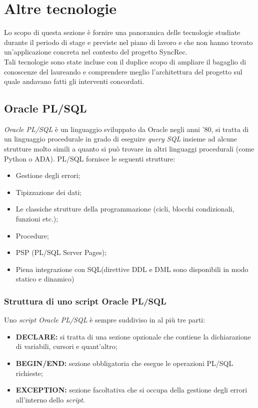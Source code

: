 

\chapter{Altre tecnologie} \label{Appendice-1}

Lo scopo di questa sezione è fornire una panoramica delle tecnologie studiate durante il periodo di stage e previste nel piano di lavoro e che non hanno trovato un'applicazione concreta nel contesto del progetto SyncRec.\\
Tali tecnologie sono state incluse con il duplice scopo di ampliare il bagaglio di conoscenze del laureando e comprendere meglio l'architettura del progetto sul quale andavano fatti gli interventi concordati.

\section{Oracle PL/SQL} \label{plsql}
\textit{Oracle PL/SQL} è un linguaggio sviluppato da Oracle negli anni '80, si tratta di un linguaggio procedurale in grado di eseguire \textit{query SQL} insieme ad alcune strutture molto simili a quanto si può trovare in altri linguaggi procedurali (come \gls{Python} o \gls{ADA}).
PL/SQL fornisce le seguenti strutture:
\begin{itemize}
	\item Gestione degli errori;
	\item Tipizzazione dei dati;
	\item Le classiche strutture della programmazione (cicli, blocchi condizionali, funzioni etc.);
	\item Procedure;
	\item PSP (PL/SQL Server Pages);
	\item Piena integrazione con SQL(direttive DDL e DML sono disponibili in modo statico e dinamico)
\end{itemize}

\subsection{Struttura di uno script Oracle PL/SQL}
Uno \textit{script Oracle PL/SQL} è sempre suddiviso in al più tre parti:
\begin{itemize}
	\item \textbf{DECLARE:} si tratta di una sezione opzionale che contiene la dichiarazione di variabili, cursori e quant'altro;
	\item \textbf{BEGIN/END:} sezione obbligatoria che esegue le operazioni PL/SQL richieste;
	\item \textbf{EXCEPTION:} sezione facoltativa che si occupa della gestione degli errori all'interno dello \textit{script}.
\end{itemize}

